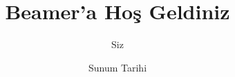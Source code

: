 \documentclass{beamer}
\title{Beamer'a Hoş Geldiniz}
\author{Siz}
\institute{Neredensiniz(Üniversite)}
\date{Sunum Tarihi}
\begin{document}
\begin{frame}
\titlepage %
\end{frame}
\end{document}
